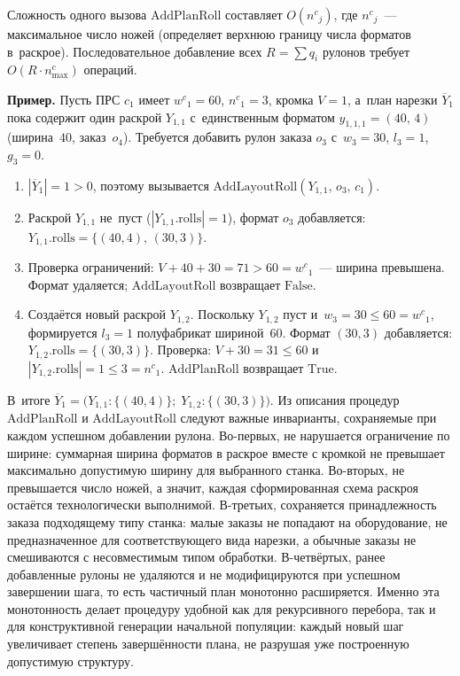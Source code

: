 Сложность одного вызова $\mathrm{AddPlanRoll}$ составляет $O({n^c}_j)$, где ${n^c}_j$~--- максимальное число ножей (определяет верхнюю границу числа форматов в~раскрое).
Последовательное добавление всех $R=\sum q_i$ рулонов требует $O(R\cdot n^c_{\max})$ операций.

\textbf{Пример.}
Пусть ПРС $c_1$ имеет ${w^c}_1=60$, ${n^c}_1=3$, кромка $V=1$, а~план нарезки $\overline{Y}_1$ пока содержит один раскрой $Y_{1,1}$ с~единственным форматом $y_{1,1,1}=(40,\,4)$ (ширина~$40$, заказ~$o_4$).
Требуется добавить рулон заказа $o_3$ с~$w_3=30$, $l_3=1$, $g_3=0$.

\begin{enumerate}
\item $|\overline{Y}_1|=1>0$, поэтому вызывается $\mathrm{AddLayoutRoll}(Y_{1,1},\,o_3,\,c_1)$.
\item Раскрой $Y_{1,1}$ не~пуст ($|Y_{1,1}.\mathrm{rolls}|=1$), формат $o_3$ добавляется: $Y_{1,1}.\mathrm{rolls}=\{(40,4),\,(30,3)\}$.
\item Проверка ограничений: $V+40+30=71>60={w^c}_1$~--- ширина превышена. Формат удаляется; $\mathrm{AddLayoutRoll}$ возвращает $\mathrm{False}$.
\item Создаётся новый раскрой $Y_{1,2}$. Поскольку $Y_{1,2}$ пуст и~$w_3=30\le 60={w^c}_1$, формируется $l_3=1$ полуфабрикат шириной~$60$.
Формат $(30,3)$ добавляется: $Y_{1,2}.\mathrm{rolls}=\{(30,3)\}$.
Проверка: $V+30=31\le 60$ и~$|Y_{1,2}.\mathrm{rolls}|=1\le 3={n^c}_1$.
$\mathrm{AddPlanRoll}$ возвращает $\mathrm{True}$.
\end{enumerate}
В~итоге $\overline{Y}_1=\bigl(Y_{1,1}:\{(40,4)\};\;Y_{1,2}:\{(30,3)\}\bigr)$.
Из описания процедур $\mathrm{AddPlanRoll}$ и $\mathrm{AddLayoutRoll}$ следуют важные инварианты, сохраняемые при каждом успешном добавлении рулона. Во-первых, не нарушается ограничение по ширине: суммарная ширина форматов в раскрое вместе с кромкой не превышает максимально допустимую ширину для выбранного станка. Во-вторых, не превышается число ножей, а значит, каждая сформированная схема раскроя остаётся технологически выполнимой.
В-третьих, сохраняется принадлежность заказа подходящему типу станка: малые заказы не попадают на оборудование, не предназначенное для соответствующего вида нарезки, а обычные заказы не смешиваются с несовместимым типом обработки. В-четвёртых, ранее добавленные рулоны не удаляются и не модифицируются при успешном завершении шага, то есть частичный план монотонно расширяется. Именно эта монотонность делает процедуру удобной как для рекурсивного перебора, так и для конструктивной генерации начальной популяции: каждый новый шаг увеличивает степень завершённости плана, не разрушая уже построенную допустимую структуру.

